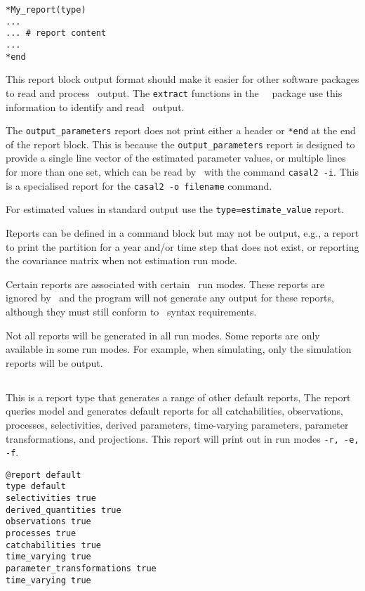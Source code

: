 \begin{verbatim}
*My_report(type)
...
... # report content
...
*end
\end{verbatim}

This report block output format should make it easier for other software packages to read and process \CNAME\ output. The \texttt{extract} functions in the \R\ \CNAME\ package use this information to identify and read \CNAME\ output.

The \texttt{output\_parameters} report does not print either a header or \texttt{*end} at the end of the report block. This is because the \texttt{output\_parameters} report is designed to provide a single line vector of the estimated parameter values, or multiple lines for more than one set, which can be read by \CNAME\ with the command \texttt{casal2 -i}. This is a specialised report for the \texttt{casal2 -o filename} command.

For estimated values in standard output use the \texttt{type=estimate\_value} report.

Reports can be defined in a  command block but may not be output, e.g., a report to print the partition for a year and/or time step that does not exist, or reporting the covariance matrix when not estimation run mode.

Certain reports are associated with certain \CNAME\ run modes. These reports are ignored by \CNAME\ and the program will not generate any output for these reports, although they must still conform to \CNAME\ syntax requirements.

Not all reports will be generated in all run modes. Some reports are only available in some run modes. For example, when simulating, only the simulation reports will be output.

\subsection{}\label{sec:Report-Default}

This is a report type that generates a range of other default reports, The report queries model and generates default reports for all catchabilities, observations, processes, selectivities, derived parameters, time-varying parameters, parameter transformations, and projections. This report will print out in run modes \texttt{-r, -e, -f}.


\begin{verbatim}
@report default
type default
selectivities true
derived_quantities true
observations true
processes true
catchabilities true
time_varying true
parameter_transformations true
time_varying true
\end{verbatim}




